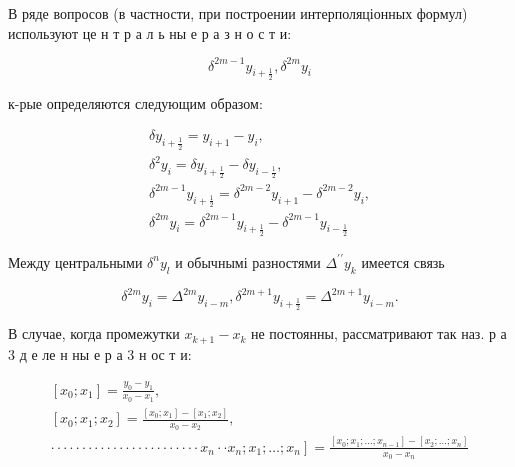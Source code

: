 \documentclass[10pt]{article}
\begin{document}
В ряде вопросов (в частности, при построении интерполяціонных формул) используют це н т р а л ь ны е р а з н о с т и:



\[

\delta^{2 m-1} y_{i+\frac{1}{2}}, \delta^{2 m} y_{i}

\]



к-рые определяются следующим образом:



\[

\begin{gathered}

\delta y_{i+\frac{1}{2}}=y_{i+1}-y_{i}, \\

\delta^{2} y_{i}=\delta y_{i+\frac{1}{2}}-\delta y_{i-\frac{1}{2}}, \\

\delta^{2 m-1} y_{i+\frac{1}{2}}=\delta^{2 m-2} y_{i+1}-\delta^{2 m-2} y_{i}, \\

\delta^{2 m} y_{i}=\delta^{2 m-1} y_{i+\frac{1}{2}}-\delta^{2 m-1} y_{i-\frac{1}{2}}

\end{gathered}

\]



Между центральными $\delta^{n} y_{l}$ и обычнымі разностями $\Delta^{\prime \prime} y_{k}$ имеется связь



\[

\delta^{2 m} y_{i}=\Delta^{2 m} y_{i-m}, \delta^{2 m+1} y_{i+\frac{1}{2}}=\Delta^{2 m+1} y_{i-m} .

\]



В случае, когда промежутки $x_{k+1}-x_{k}$ не постоянны, рассматривают так наз. р а 3 д е ле н ны е р а 3 н ос т и:



\[

\begin{gathered}

{\left[x_{0} ; x_{1}\right]=\frac{y_{0}-y_{1}}{x_{0}-x_{1}},} \\

{\left[x_{0} ; x_{1} ; x_{2}\right]=\frac{\left[x_{0} ; x_{1}\right]-\left[x_{1} ; x_{2}\right]}{x_{0}-x_{2}},} \\

\left.\cdot \cdot \cdot \cdot \cdot \cdot \cdot \cdot \cdot \cdot \cdot \cdot \cdot \cdot \cdot \cdot \cdot \cdot \cdot \cdot \cdot \cdot \cdot \cdot x_{n} \cdot \cdot x_{n} ; x_{1} ; \ldots ; x_{n}\right]=\frac{\left[x_{0} ; x_{1} ; \ldots ; x_{n-1}\right]-\left[x_{2} ; \ldots ; x_{n}\right]}{x_{0}-x_{n}}

\end{gathered}

\]
\end{document}
